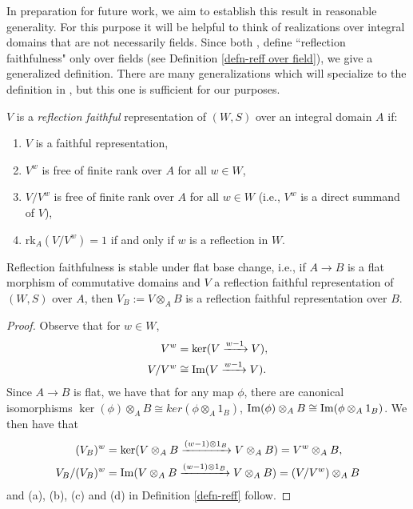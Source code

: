 In preparation for future work, we aim to establish this result in reasonable generality. For this purpose it will be helpful to think of realizations over integral domains that are not necessarily fields. Since both \cite{WillSingular}, \cite{Soer07} define ``reflection faithfulness" only over fields (see Definition \ref{defn-reff over field}), we give a generalized definition. There are many generalizations which will specialize to the definition in \cite{WillSingular, Soer07}, but this one is sufficient for our purposes.
\begin{defn}\label{defn-reff}
    $V$ is a \emph{reflection faithful} representation of $(W,S)$ over an integral domain $A$ if:
    \begin{enumerate}
        \item [(a)] $V$ is a faithful representation,
        \item [(b)] $V^w$ is free of finite rank over $A$ for all $w\in W$,
        \item [(c)] $V/V^w$ is free of finite rank over $A$ for all $w \in W$ (i.e., $V^w$ is a direct summand of $V$),
        \item [(d)] rk$_A(V/V^w)=1$ if and only if $w$ is a reflection in $W$.
    \end{enumerate}
\end{defn}


\begin{lemma}\label{reff flat base change}
    Reflection faithfulness is stable under flat base change, i.e., if $A\rightarrow B$ is a flat morphism of commutative domains and $V$ a reflection faithful representation of $(W,S)$ over $A$, then $V_B :=V\otimes_A B$ is a reflection faithful representation over $B$.
\end{lemma}
\begin{proof}
    Observe that for $w\in W$,
    \begin{align*}
        V^w &= \ker(V \xrightarrow{w-1}V), \\
        V/V^w &\cong\operatorname{Im}(V\xrightarrow{w-1}V). \end{align*}
    Since $A \rightarrow B$ is flat, we have that for any map $\phi$, there are canonical isomorphisms $\ker(\phi)\otimes_A B \cong ker(\phi \otimes_A 1_B)$, $\operatorname{Im}(\phi)\otimes_A B \cong \operatorname{Im}(\phi \otimes_A 1_B)$. 
    We then have that
    \begin{align*}
        (V_B)^w &= \ker(V\otimes_A B \xrightarrow{(w-1)\otimes 1_B} V\otimes_A B) = V^w \otimes_A B,\\
        V_B/(V_B)^w &= \operatorname{Im}(V\otimes_A B \xrightarrow{(w-1)\otimes 1_B} V\otimes_A B)=(V/V^w)\otimes_A B
    \end{align*}
    and (a), (b), (c) and (d) in Definition \ref{defn-reff} follow.
\end{proof}

